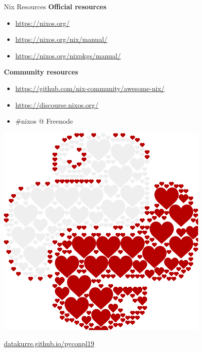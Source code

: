\documentclass[12pt,aspectratio=169]{beamer}
\begin{document}

\begin{frame}{Nix Resources}
  \textbf{Official resources}
  \begin{itemize}
    \item \href{https://nixos.org/}{https://nixos.org/}
    \item \href{https://nixos.org/nix/manual/}{https://nixos.org/nix/manual/}
    \item \href{https://nixos.org/nixpkgs/manual/}{https://nixos.org/nixpkgs/manual/}
  \end{itemize}
  \textbf{Community resources}
  \begin{itemize}
    \item \href{https://github.com/nix-community/awesome-nix/}{https://github.com/nix-community/awesome-nix/}
    \item \href{https://discourse.nixos.org/}{https://discourse.nixos.org/}
    \item \#nixos @ Freenode
  \end{itemize}
\end{frame}


\begin{frame}[standout]
\vfill
\includegraphics[height=0.50\paperheight]{images/pyconplhearts.png}
\par
\href{https://datakurre.github.io/pyconpl19/}{datakurre.github.io/pyconpl19}
\end{frame}

\end{document}

